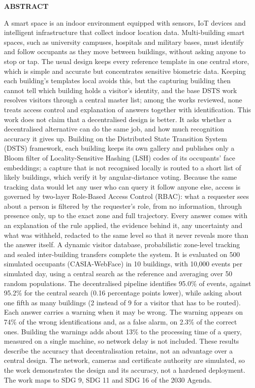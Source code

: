 \documentclass[12pt,a4paper,oneside]{report}
\begin{document}
\clearpage
{}
{}
{\centering \Large\bfseries ABSTRACT\par}
A smart space is an indoor environment equipped with sensors, IoT devices and intelligent infrastructure that collect indoor location data. Multi-building smart spaces, such as university campuses, hospitals and military bases, must identify and follow occupants as they move between buildings, without asking anyone to stop or tap. The usual design keeps every reference template in one central store, which is simple and accurate but concentrates sensitive biometric data. Keeping each building's templates local avoids this, but the capturing building then cannot tell which building holds a visitor's identity, and the base DSTS work resolves visitors through a central master list; among the works reviewed, none treats access control and explanation of answers together with identification. This work does not claim that a decentralised design is better. It asks whether a decentralised alternative can do the same job, and how much recognition accuracy it gives up. Building on the Distributed State Transition System (DSTS) framework, each building keeps its own gallery and publishes only a Bloom filter of Locality-Sensitive Hashing (LSH) codes of its occupants' face embeddings; a capture that is not recognised locally is routed to a short list of likely buildings, which verify it by angular-distance voting. Because the same tracking data would let any user who can query it follow anyone else, access is governed by two-layer Role-Based Access Control (RBAC): what a requester sees about a person is filtered by the requester's role, from no information, through presence only, up to the exact zone and full trajectory. Every answer comes with an explanation of the rule applied, the evidence behind it, any uncertainty and what was withheld, redacted to the same level so that it never reveals more than the answer itself. A dynamic visitor database, probabilistic zone-level tracking and sealed inter-building transfers complete the system. It is evaluated on 500 simulated occupants (CASIA-WebFace) in 10 buildings, with 10,000 events per simulated day, using a central search as the reference and averaging over 50 random populations. The decentralised pipeline identifies 95.0\% of events, against 95.2\% for the central search (0.16 percentage points lower), while asking about one fifth as many buildings (2 instead of 9 for a visitor that has to be routed). Each answer carries a warning when it may be wrong. The warning appears on 74\% of the wrong identifications and, as a false alarm, on 2.3\% of the correct ones. Building the warnings adds about 13\% to the processing time of a query, measured on a single machine, so network delay is not included. These results describe the accuracy that decentralisation retains, not an advantage over a central design. The network, cameras and certificate authority are simulated, so the work demonstrates the design and its accuracy, not a hardened deployment. The work maps to SDG 9, SDG 11 and SDG 16 of the 2030 Agenda.
\end{document}
